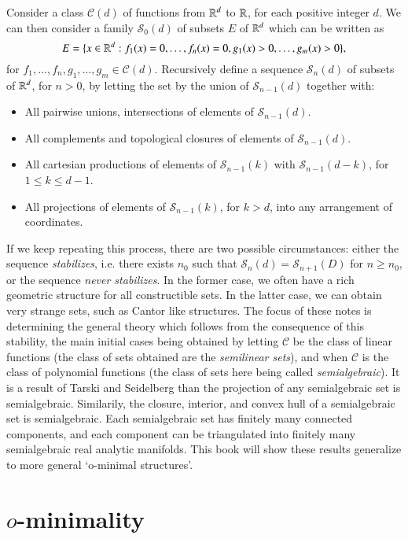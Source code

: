 Consider a class $\mathcal{C}(d)$ of functions from $\operatorname{\mathbb{R}}^d$ to $\operatorname{\mathbb{R}}$, for each positive integer $d$. We can then consider a family $\mathcal{S}_0(d)$ of subsets $E$ of $\operatorname{\mathbb{R}}^d$ which can be written as
%
\[ E = \{ x \in \operatorname{\mathbb{R}}^d: f_1(x) = 0, \dots, f_n(x) = 0, g_1(x) > 0, \dots, g_m(x) > 0 \}, \]
%
for $f_1,\dots,f_n, g_1, \dots, g_m \in \mathcal{C}(d)$. Recursively define a sequence $\mathcal{S}_n(d)$ of subsets of $\operatorname{\mathbb{R}}^d$, for $n > 0$, by letting the set by the union of $\mathcal{S}_{n-1}(d)$ together with:
%
\begin{itemize}
    \item All pairwise unions, intersections of elements of $\mathcal{S}_{n-1}(d)$.
    \item All complements and topological closures of elements of $\mathcal{S}_{n-1}(d)$.
    \item All cartesian productions of elements of $\mathcal{S}_{n-1}(k)$ with $\mathcal{S}_{n-1}(d-k)$, for $1 \leq k \leq d-1$.
    \item All projections of elements of $\mathcal{S}_{n-1}(k)$, for $k > d$, into any arrangement of coordinates.
\end{itemize}
%
If we keep repeating this process, there are two possible circumstances: either the sequence \emph{stabilizes}, i.e. there exists $n_0$ such that $\mathcal{S}_n(d) = \mathcal{S}_{n+1}(D)$ for $n \geq n_0$, or the sequence \emph{never stabilizes}. In the former case, we often have a rich geometric structure for all constructible sets. In the latter case, we can obtain very strange sets, such as Cantor like structures. The focus of these notes is determining the general theory which follows from the consequence of this stability, the main initial cases being obtained by letting $\mathcal{C}$ be the class of linear functions (the class of sets obtained are the \emph{semilinear sets}), and when $\mathcal{C}$ is the class of polynomial functions (the class of sets here being called \emph{semialgebraic}). It is a result of Tarski and Seidelberg than the projection of any semialgebraic set is semialgebraic. Similarily, the closure, interior, and convex hull of a semialgebraic set is semialgebraic. Each semialgebraic set has finitely many connected components, and each component can be triangulated into finitely many semialgebraic real analytic manifolds. This book will show these results generalize to more general `o-minimal structures'.

\section{$o$-minimality}

